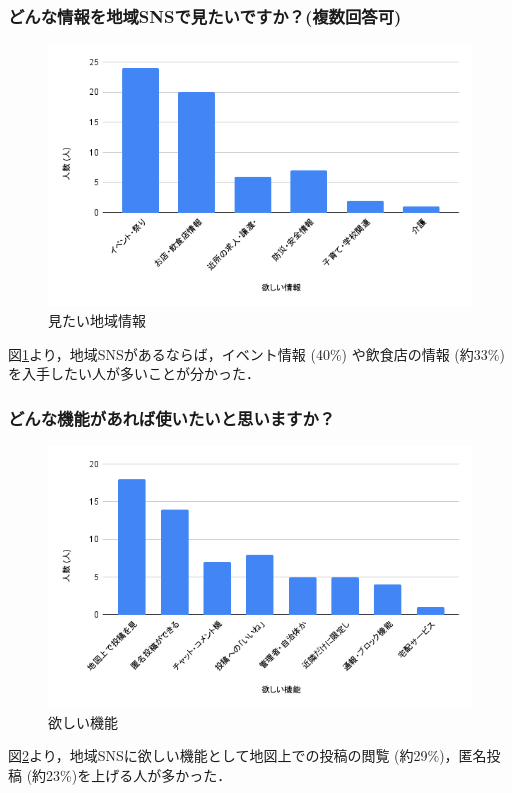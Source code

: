 \subsubsection{どんな情報を地域SNSで見たいですか？(複数回答可)}
\begin{figure}[H]
    \centering
    \includegraphics[width=0.5\linewidth]{sections/fig125/Q4.png}
    \caption{見たい地域情報}
    \label{fig:Q4}
\end{figure}
図\ref{fig:Q4}より，地域SNSがあるならば，イベント情報 (40\%) や飲食店の情報 (約33\%)を入手したい人が多いことが分かった．

\subsubsection{どんな機能があれば使いたいと思いますか？}
\begin{figure}[H]
    \centering
    \includegraphics[width=0.5\linewidth]{sections/fig125/Q7.png}
    \caption{欲しい機能}
    \label{fig:Q7}
\end{figure}
図\ref{fig:Q7}より，地域SNSに欲しい機能として地図上での投稿の閲覧 (約29\%)，匿名投稿 (約23\%)を上げる人が多かった．

